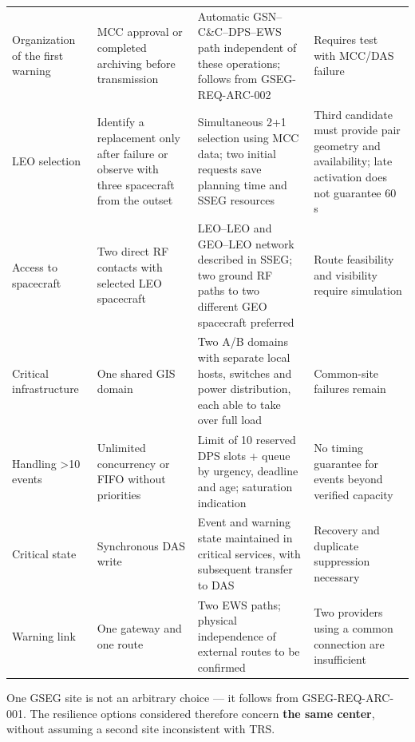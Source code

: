 \begingroup{}
\begin{longtable}{|P{0.21}|P{0.20}|P{0.37}|P{0.22}|}
\hline{}
 &  &  & \\ \hline
\endhead
\hline\endlastfoot
Organization of the first warning & MCC approval or completed archiving before transmission & Automatic GSN–C\&C–DPS–EWS path independent of these operations; follows from GSEG-REQ-ARC-002 & Requires test with MCC/\allowbreak{}DAS failure\\ \hline
LEO selection & Identify a replacement only after failure or observe with three spacecraft from the outset & Simultaneous 2+1 selection using MCC data; two initial requests save planning time and SSEG resources & Third candidate must provide pair geometry and availability; late activation does not guarantee 60 s\\ \hline
Access to spacecraft & Two direct RF contacts with selected LEO spacecraft & LEO–LEO and GEO–LEO network described in SSEG; two ground RF paths to two different GEO spacecraft preferred & Route feasibility and visibility require simulation\\ \hline
Critical infrastructure & One shared GIS domain & Two A/\allowbreak{}B domains with separate local hosts, switches and power distribution, each able to take over full load & Common-site failures remain\\ \hline
Handling >10 events & Unlimited concurrency or FIFO without priorities & Limit of 10 reserved DPS slots + queue by urgency, deadline and age; saturation indication & No timing guarantee for events beyond verified capacity\\ \hline
Critical state & Synchronous DAS write & Event and warning state maintained in critical services, with subsequent transfer to DAS & Recovery and duplicate suppression necessary\\ \hline
Warning link & One gateway and one route & Two EWS paths; physical independence of external routes to be confirmed & Two providers using a common connection are insufficient\\*
\end{longtable}
\endgroup

One GSEG site is not an arbitrary choice — it follows from GSEG-REQ-ARC-001. The resilience options considered therefore concern \textbf{the same center}, without assuming a second site inconsistent with TRS.

